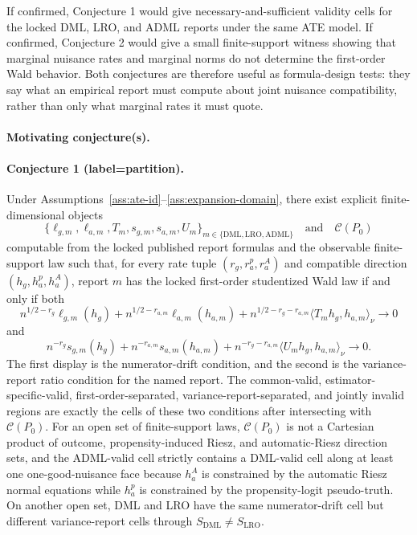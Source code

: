 \documentclass[11pt]{article}
\theoremstyle{definition}
\theoremstyle{plain}
\theoremstyle{remark}
\begin{document}
If confirmed, Conjecture 1 would give necessary-and-sufficient validity cells for the locked DML, LRO, and ADML reports under the same ATE model.  If confirmed, Conjecture 2 would give a small finite-support witness showing that marginal nuisance rates and marginal norms do not determine the first-order Wald behavior.  Both conjectures are therefore useful as formula-design tests: they say what an empirical report must compute about joint nuisance compatibility, rather than only what marginal rates it must quote.

\paragraph{Motivating conjecture(s).}
\paragraph{Conjecture 1 (label=partition).}
Under Assumptions~\ref{ass:ate-id}--\ref{ass:expansion-domain}, there exist explicit finite-dimensional objects
\[
\{\ell_{g,m},\ell_{a,m},T_m,s_{g,m},s_{a,m},U_m\}_{m\in\{\mathrm{DML},\mathrm{LRO},\mathrm{ADML}\}}
\quad\text{and}\quad \mathcal C(P_0)
\]
computable from the locked published report formulas and the observable finite-support law such that, for every rate tuple \((r_g,r^p_a,r^A_a)\) and compatible direction \((h_g,h^p_a,h^A_a)\), report \(m\) has the locked first-order studentized Wald law if and only if both
\[
n^{1/2-r_g}\ell_{g,m}(h_g)+n^{1/2-r_{a,m}}\ell_{a,m}(h_{a,m})
+n^{1/2-r_g-r_{a,m}}\langle T_mh_g,h_{a,m}\rangle_\nu \to 0
\]
and
\[
n^{-r_g}s_{g,m}(h_g)+n^{-r_{a,m}}s_{a,m}(h_{a,m})
+n^{-r_g-r_{a,m}}\langle U_mh_g,h_{a,m}\rangle_\nu \to 0 .
\]
The first display is the numerator-drift condition, and the second is the variance-report ratio condition for the named report.  The common-valid, estimator-specific-valid, first-order-separated, variance-report-separated, and jointly invalid regions are exactly the cells of these two conditions after intersecting with \(\mathcal C(P_0)\).  For an open set of finite-support laws, \(\mathcal C(P_0)\) is not a Cartesian product of outcome, propensity-induced Riesz, and automatic-Riesz direction sets, and the ADML-valid cell strictly contains a DML-valid cell along at least one one-good-nuisance face because \(h^A_a\) is constrained by the automatic Riesz normal equations while \(h^p_a\) is constrained by the propensity-logit pseudo-truth.  On another open set, DML and LRO have the same numerator-drift cell but different variance-report cells through \(S_{\mathrm{DML}}\ne S_{\mathrm{LRO}}\).
\end{document}
